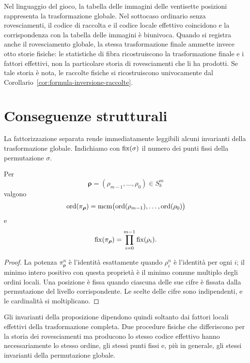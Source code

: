 	Nel linguaggio del gioco, la tabella delle immagini delle ventisette
	posizioni rappresenta la trasformazione globale. Nel sottocaso ordinario senza rovesciamenti, il codice
	di raccolta e il codice locale effettivo coincidono e la corrispondenza con la
	tabella delle immagini è biunivoca. Quando si registra anche il rovesciamento globale, la stessa
	trasformazione finale ammette invece otto storie fisiche: le statistiche di
	fibra ricostruiscono la trasformazione finale e i fattori effettivi, non la particolare
	storia di rovesciamenti che li ha prodotti. Se tale storia è nota, le raccolte
	fisiche si ricostruiscono univocamente dal Corollario~\ref{cor:formula-inversione-raccolte}.

	\section{Conseguenze strutturali}

		La fattorizzazione separata rende immediatamente leggibili alcuni invarianti
	della trasformazione globale. Indichiamo con \(\operatorname{fix}(\sigma)\) il numero dei
	punti fissi della permutazione \(\sigma\).

	\begin{proposition}
		Per
		\[
		\boldsymbol{\rho}
		=(\rho_{m-1},\dots,\rho_0)\in S_b^m
		\]
		valgono
		\[
		\operatorname{ord}(\pi_{\boldsymbol{\rho}})
		=
		\operatorname{mcm}\bigl(
		\operatorname{ord}(\rho_{m-1}),\dots,\operatorname{ord}(\rho_0)
		\bigr)
		\]
		e
		\[
		\operatorname{fix}(\pi_{\boldsymbol{\rho}})
		=
		\prod_{i=0}^{m-1}\operatorname{fix}(\rho_i).
		\]
	\end{proposition}

	\begin{proof}
		La potenza \(\pi_{\boldsymbol{\rho}}^n\) è l'identità esattamente quando
		\(\rho_i^n\) è l'identità per ogni \(i\); il minimo intero positivo con
		questa proprietà è il minimo comune multiplo degli ordini locali. Una
		posizione è fissa quando ciascuna delle sue cifre è fissata dalla
		permutazione del livello corrispondente. Le scelte delle cifre sono
		indipendenti, e le cardinalità si moltiplicano.
	\end{proof}

	Gli invarianti della proposizione dipendono quindi soltanto dai fattori
	locali effettivi della trasformazione completa. Due procedure fisiche che
	differiscono per la storia dei rovesciamenti ma producono lo stesso codice
	effettivo hanno necessariamente lo stesso ordine, gli stessi punti fissi e,
	più in generale, gli stessi invarianti della permutazione globale.

